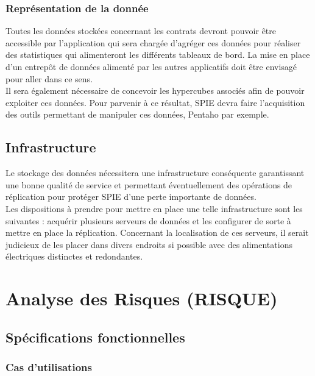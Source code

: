 \subsubsection{Représentation de la donnée}

Toutes les données stockées concernant les contrats devront pouvoir être accessible par l’application qui sera chargée d’agréger ces données pour réaliser des statistiques qui alimenteront les différents tableaux de bord. La mise en place d’un entrepôt de données alimenté par les autres applicatifs doit être envisagé pour aller dans ce sens. \\

Il sera également nécessaire de concevoir les hypercubes associés afin de pouvoir exploiter ces données. Pour parvenir à ce résultat, SPIE devra faire l’acquisition des outils permettant de manipuler ces données, Pentaho par exemple. 

\subsection{Infrastructure}

Le stockage des données nécessitera une infrastructure conséquente garantissant une bonne qualité de service et permettant éventuellement des opérations de réplication pour protéger SPIE d’une perte importante de données. \\

Les dispositions à prendre pour mettre en place une telle infrastructure sont les suivantes : acquérir plusieurs serveurs de données et les configurer de sorte à mettre en place la réplication. Concernant la localisation de ces serveurs, il serait judicieux de les placer dans divers endroits si possible avec des alimentations électriques distinctes et redondantes. 

\section{Analyse des Risques (RISQUE)}%

\subsection{Spécifications fonctionnelles}

\subsubsection{Cas d’utilisations}

